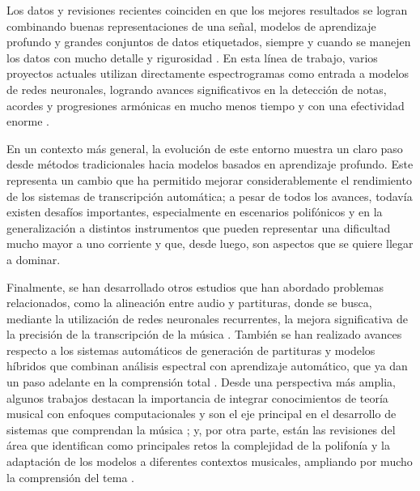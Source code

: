 Los datos y revisiones recientes coinciden en que los mejores resultados se logran combinando buenas representaciones de una señal, modelos de aprendizaje profundo y grandes conjuntos de datos etiquetados, siempre y cuando se manejen los datos con mucho detalle y rigurosidad \cite{survey2024}. En esta línea de trabajo, varios proyectos actuales utilizan directamente espectrogramas como entrada a modelos de redes neuronales, logrando avances significativos en la detección de notas, acordes y progresiones armónicas en mucho menos tiempo y con una efectividad enorme \cite{cqt2025, melody2025}.

En un contexto más general, la evolución de este entorno muestra un claro paso desde métodos tradicionales hacia modelos basados en aprendizaje profundo. Este representa un cambio que ha permitido mejorar considerablemente el rendimiento de los sistemas de transcripción automática; a pesar de todos los avances, todavía existen desafíos importantes, especialmente en escenarios polifónicos y en la generalización a distintos instrumentos que pueden representar una dificultad mucho mayor a uno corriente y que, desde luego, son aspectos que se quiere llegar a dominar.

Finalmente, se han desarrollado otros estudios que han abordado problemas relacionados, como la alineación entre audio y partituras, donde se busca, mediante la utilización de redes neuronales recurrentes, la mejora significativa de la precisión de la transcripción de la música \cite{audioalign2018}. También se han realizado avances respecto a los sistemas automáticos de generación de partituras y modelos híbridos que combinan análisis espectral con aprendizaje automático, que ya dan un paso adelante en la comprensión total \cite{jcss2021, jme2024}. Desde una perspectiva más amplia, algunos trabajos destacan la importancia de integrar conocimientos de teoría musical con enfoques computacionales y son el eje principal en el desarrollo de sistemas que comprendan la música \cite{digitalhumanities2022}; y, por otra parte, están las revisiones del área que identifican como principales retos la complejidad de la polifonía y la adaptación de los modelos a diferentes contextos musicales, ampliando por mucho la comprensión del tema \cite{jiis2014}.